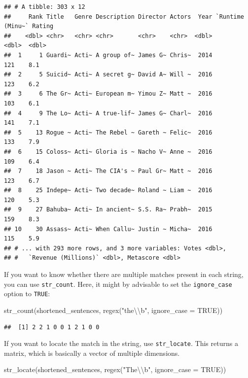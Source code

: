 \documentclass[
]{book}
\newenvironment{Shaded}{\begin{snugshade}}{\end{snugshade}}
\newcommand{\AttributeTok}[1]{\textcolor[rgb]{0.77,0.63,0.00}{#1}}
\newcommand{\ConstantTok}[1]{\textcolor[rgb]{0.00,0.00,0.00}{#1}}
\newcommand{\FunctionTok}[1]{\textcolor[rgb]{0.00,0.00,0.00}{#1}}
\newcommand{\NormalTok}[1]{#1}
\newcommand{\SpecialCharTok}[1]{\textcolor[rgb]{0.00,0.00,0.00}{#1}}
\newcommand{\StringTok}[1]{\textcolor[rgb]{0.31,0.60,0.02}{#1}}
\begin{document}
\begin{verbatim}
## # A tibble: 303 x 12
##     Rank Title   Genre Description Director Actors  Year `Runtime (Minu~` Rating
##    <dbl> <chr>   <chr> <chr>       <chr>    <chr>  <dbl>            <dbl>  <dbl>
##  1     1 Guardi~ Acti~ A group of~ James G~ Chris~  2014              121    8.1
##  2     5 Suicid~ Acti~ A secret g~ David A~ Will ~  2016              123    6.2
##  3     6 The Gr~ Acti~ European m~ Yimou Z~ Matt ~  2016              103    6.1
##  4     9 The Lo~ Acti~ A true-lif~ James G~ Charl~  2016              141    7.1
##  5    13 Rogue ~ Acti~ The Rebel ~ Gareth ~ Felic~  2016              133    7.9
##  6    15 Coloss~ Acti~ Gloria is ~ Nacho V~ Anne ~  2016              109    6.4
##  7    18 Jason ~ Acti~ The CIA's ~ Paul Gr~ Matt ~  2016              123    6.7
##  8    25 Indepe~ Acti~ Two decade~ Roland ~ Liam ~  2016              120    5.3
##  9    27 Bahuba~ Acti~ In ancient~ S.S. Ra~ Prabh~  2015              159    8.3
## 10    30 Assass~ Acti~ When Callu~ Justin ~ Micha~  2016              115    5.9
## # ... with 293 more rows, and 3 more variables: Votes <dbl>,
## #   `Revenue (Millions)` <dbl>, Metascore <dbl>
\end{verbatim}

If you want to know whether there are multiple matches present in each string, you can use \texttt{str\_count}. Here, it might by advisable to set the \texttt{ignore\_case} option to \texttt{TRUE}:

\begin{Shaded}
\begin{Highlighting}[]
\FunctionTok{str\_count}\NormalTok{(shortened\_sentences, }\FunctionTok{regex}\NormalTok{(}\StringTok{"the}\SpecialCharTok{\textbackslash{}\textbackslash{}}\StringTok{b"}\NormalTok{, }\AttributeTok{ignore\_case =} \ConstantTok{TRUE}\NormalTok{))}
\end{Highlighting}
\end{Shaded}

\begin{verbatim}
##  [1] 2 2 1 0 0 1 2 1 0 0
\end{verbatim}

If you want to locate the match in the string, use \texttt{str\_locate}. This returns a matrix, which is basically a vector of multiple dimensions.

\begin{Shaded}
\begin{Highlighting}[]
\FunctionTok{str\_locate}\NormalTok{(shortened\_sentences, }\FunctionTok{regex}\NormalTok{(}\StringTok{"The}\SpecialCharTok{\textbackslash{}\textbackslash{}}\StringTok{b"}\NormalTok{, }\AttributeTok{ignore\_case =} \ConstantTok{TRUE}\NormalTok{))}
\end{Highlighting}
\end{Shaded}
\end{document}
